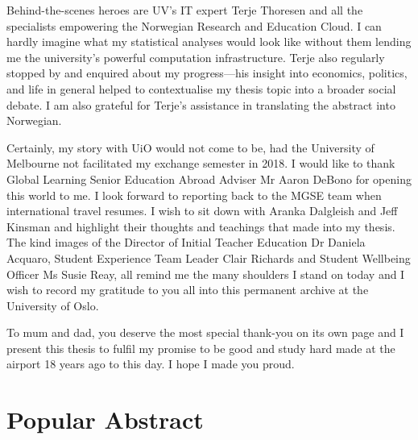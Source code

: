 \documentclass[a4paper,11pt,UKenglish,twoside,openright]{report}\usepackage[]{graphicx}\usepackage[]{color}
\begin{document}
Behind-the-scenes heroes are UV's IT expert Terje Thoresen and all the specialists empowering the Norwegian Research and Education Cloud. I can hardly imagine what my statistical analyses would look like without them lending me the university's powerful computation infrastructure. Terje also regularly stopped by and enquired about my progress---his insight into economics, politics, and life in general helped to contextualise my thesis topic into a broader social debate. I am also grateful for Terje's assistance in translating the abstract into Norwegian.

Certainly, my story with UiO would not come to be, had the University of Melbourne not facilitated my exchange semester in 2018. I would like to thank Global Learning Senior Education Abroad Adviser Mr Aaron DeBono for opening this world to me. I look forward to reporting back to the MGSE team when international travel resumes. I wish to sit down with Aranka Dalgleish and Jeff Kinsman and highlight their thoughts and teachings that made into my thesis. The kind images of the Director of Initial Teacher Education Dr Daniela Acquaro, Student Experience Team Leader Clair Richards and Student Wellbeing Officer Ms Susie Reay, all remind me the many shoulders I stand on today and I wish to record my gratitude to you all into this permanent archive at the University of Oslo.

To mum and dad, you deserve the most special thank-you on its own page and I present this thesis to fulfil my promise to be good and study hard made at the airport 18 years ago to this day. I hope I made you proud.


\chapter*{Popular Abstract}
\label{Ab.0}
\end{document}
